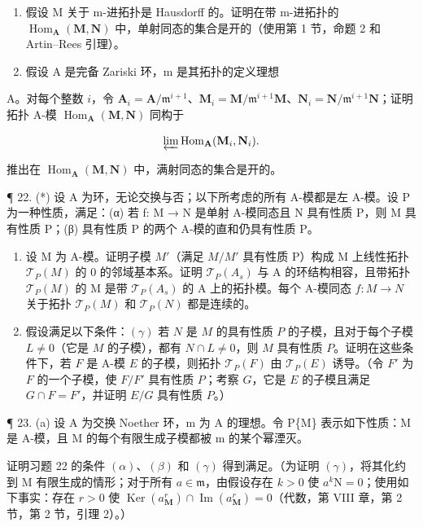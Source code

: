 \begin{enumerate}
\def\labelenumi{(\alph{enumi})}
\item
  假设 M 关于 m-进拓扑是 Hausdorff 的。证明在带 m-进拓扑的 \(\operatorname{Hom}_{\mathbf{A}}(\mathbf{M}, \mathbf{N})\) 中，单射同态的集合是开的（使用第 1 节，命题 2 和 Artin–Rees 引理）。
\item
  假设 A 是完备 Zariski 环，m 是其拓扑的定义理想
\end{enumerate}

A。对每个整数 \(i\)，令 \(\mathbf{A}_i = \mathbf{A} / \mathfrak{m}^{i+1}\)、\(\mathbf{M}_i = \mathbf{M} / \mathfrak{m}^{i+1}\mathbf{M}\)、\(\mathbf{N}_i = \mathbf{N} / \mathfrak{m}^{i+1}\mathbf{N}\)；证明拓扑 A-模 \(\operatorname{Hom}_{\mathbf{A}}(\mathbf{M}, \mathbf{N})\) 同构于

\[
\varprojlim \operatorname{Hom} _ {\mathbf {A}} (\mathbf {M} _ {i}, \mathbf {N} _ {i}).
\]

推出在 \(\operatorname{Hom}_{\mathbf{A}}(\mathbf{M},\mathbf{N})\) 中，满射同态的集合是开的。

¶ 22. (*) 设 A 为环，无论交换与否；以下所考虑的所有 A-模都是左 A-模。设 P 为一种性质，满足：(α) 若 f: M → N 是单射 A-模同态且 N 具有性质 P，则 M 具有性质 P；(β) 具有性质 P 的两个 A-模的直和仍具有性质 P。

\begin{enumerate}
\def\labelenumi{(\alph{enumi})}
\item
   设 M 为 A-模。证明子模 \(M'\)（满足 \(M/M'\) 具有性质 P）构成 M 上线性拓扑 \(\mathcal{T}_{P}(M)\) 的 0 的邻域基本系。证明 \(\mathcal{T}_{P}(A_{s})\) 与 A 的环结构相容，且带拓扑 \(\mathcal{T}_{P}(M)\) 的 M 是带 \(\mathcal{T}_{P}(A_{s})\) 的 A 上的拓扑模。每个 A-模同态 \(f: M \to N\) 关于拓扑 \(\mathcal{T}_{P}(M)\) 和 \(\mathcal{T}_{P}(N)\) 都是连续的。
\item
  假设满足以下条件：\((\gamma)\) 若 \(N\) 是 \(M\) 的具有性质 \(P\) 的子模，且对于每个子模 \(L \neq 0\)（它是 \(M\) 的子模），都有 \(N \cap L \neq 0\)，则 \(M\) 具有性质 \(P\)。证明在这些条件下，若 \(F\) 是 A-模 \(E\) 的子模，则拓扑 \(\mathcal{T}_P(F)\) 由 \(\mathcal{T}_P(E)\) 诱导。（令 \(F'\) 为 \(F\) 的一个子模，使 \(F/F'\) 具有性质 \(P\)；考察 \(G\)，它是 \(E\) 的子模且满足 \(G \cap F = F'\)，并证明 \(E/G\) 具有性质 \(P\)。）
\end{enumerate}

¶ 23. (a) 设 A 为交换 Noether 环，m 为 A 的理想。令 P\{M\} 表示如下性质：M 是 A-模，且 M 的每个有限生成子模都被 m 的某个幂湮灭。

证明习题 22 的条件 \((\alpha)\)、\((\beta)\) 和 \((\gamma)\) 得到满足。（为证明 \((\gamma)\)，将其化约到 M 有限生成的情形；对于所有 \(a \in \mathfrak{m}\)，由假设存在 \(k > 0\) 使 \(a^k\mathrm{N} = 0\)；使用如下事实：存在 \(r > 0\) 使 \(\operatorname{Ker}(a_{\mathbf{M}}^r) \cap \operatorname{Im}(a_{\mathbf{M}}^r) = 0\)（代数，第 VIII 章，第 2 节，第 2 节，引理 2）。）

